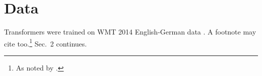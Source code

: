 \section{Data}
Transformers were trained on WMT 2014 English-German data \citep{vaswani2017,einstein1935}. %
A footnote may cite too.\footnote{As noted by \citet{planck2015}.} Sec.~2 continues.
